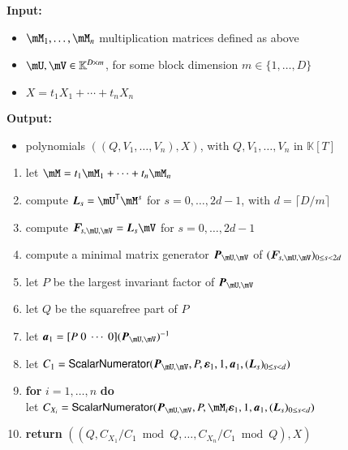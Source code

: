 \documentclass[final,1p,times,authoryear]{elsarticle}
\newcommand{\mat}[1]{\bm{\MakeUppercase{#1}}} %
\newcommand{\row}[1]{\bm{\MakeLowercase{#1}}} %
\newcommand{\col}[1]{\bm{\MakeLowercase{#1}}} %
\newcommand{\seqelt}[1]{\bm{F}_{#1}} %
\newcommand{\minpoly}{P}
\newcommand{\mainalgoname}{\mathsf{ BlockParametrization}}
\newcommand{\lf}{X}
\newcommand{\sqfree}{Q}
\newcommand{\trsp}[1]{#1^{\mathsf{T}}} %
\def\K{\mathbb{K}}
\def\K {\ensuremath{\mathbb{K}}}
\newcommand{\mUt}{\trsp{\mU}}
\begin{document}
\begin{algorithm}[H]
  \caption{$\mainalgoname(\mM_1,\dots,\mM_n,\mU,\mV,\lf)$}
  {\bf Input:} \vspace{-0.5em}
  \begin{itemize}
    \item $\mM_1,\dots,\mM_n$ multiplication matrices defined as above
    \item  $\mU,\mV \in \mathbb{K}^{D \times m}$, for some block dimension  $m \in \{1,\dots,D\}$
    \item $\lf =t_1 X_1 + \cdots + t_n X_n$
  \end{itemize}
  {\bf Output:}  \vspace{-0.5em}
  \begin{itemize}
    \item         polynomials $((\sqfree,V_1,\dots,V_n),\lf)$, with $\sqfree,V_1,\dots,V_n$ in $\K[T]$
  \end{itemize}
  \begin{enumerate}
    \item\label{mainstep1}   let $\mM = t_1 \mM_1 + \cdots + t_n \mM_n$
    \item\label{mainstep3} { compute $\mat{L}_s = \mUt\mM^s$ for $s=0,\dots,2d-1$, with $d = \lceil D/m \rceil$}
    \item\label{mainstep4} { compute $\seqelt{s,\mU,\mV}= \mat{L}_s\mV$ for $s=0,\dots, 2d-1$}
    \item\label{mainstep5} { compute a minimal matrix generator $\mat{P}_{\mU,\mV}$ of $(\seqelt{s,\mU,\mV})_{0 \le s < 2d}$}
    \item\label{mainstep6} { let $\minpoly$ be the largest invariant factor of $\mat{P}_{\mU,\mV}$}
    \item\label{mainstep7} { let $\sqfree$ be  the squarefree part  of $\minpoly$}
    \item\label{mainstep8} { let $\row{a}_1 = [P~0 ~\cdots~ 0] (\mat{P}_{\mU,\mV})^{-1}$}
    \item\label{mainstep9}  let $C_1 = \mathsf{{\sf ScalarNumerator}}(\mat{P}_{\mU,\mV}, \minpoly, \col{\varepsilon}_1, 1, \row{a}_1, 
      (\mat{L}_s)_{0 \le s < d})$
    \item\label{mainstep10} \textbf{for} $i=1,\dots,n$ \textbf{do} \\
      \phantom{for}  let $C_{X_i} = \mathsf{{\sf ScalarNumerator}}(\mat{P}_{\mU,\mV}, \minpoly, \mM_i\col{\varepsilon}_1, 1, \row{a}_1, (\mat{L}_s)_{0 \le s < d})$
    \item\label{mainstep11}     \textbf{return} $((\sqfree, C_{X_1}/ C_1 \bmod \sqfree, \dots, C_{X_n}/ C_{1} \bmod \sqfree),\lf)$
  \end{enumerate}  \label{algo:block-sparse-fglm}
\end{algorithm}
\end{document}
